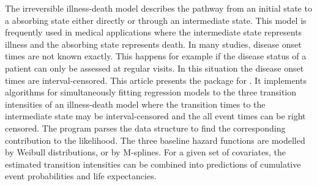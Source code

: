 The irreversible illness-death model describes the pathway from an
initial state to a absorbing state either directly or through an
intermediate state. This model is frequently used in medical
applications where the intermediate state represents illness and the
absorbing state represents death. In many studies, disease onset times
are not known exactly. This happens for example if the disease status
of a patient can only be assessed at regular visits. In this situation
the disease onset times are interval-censored. This article presents
the  package for . It implements
algorithms for simultaneously fitting regression models to the three
transition intensities of an illness-death model where the transition
times to the intermediate state may be interval-censored and the all
event times can be right censored. The program parses the data
structure to find the corresponding contribution to the likelihood.
The three baseline hazard functions are modelled by Weibull
distributions, or by M-splines. For a given set of covariates, the
estimated transition intensities can be combined into predictions of
cumulative event probabilities and life expectancies.
